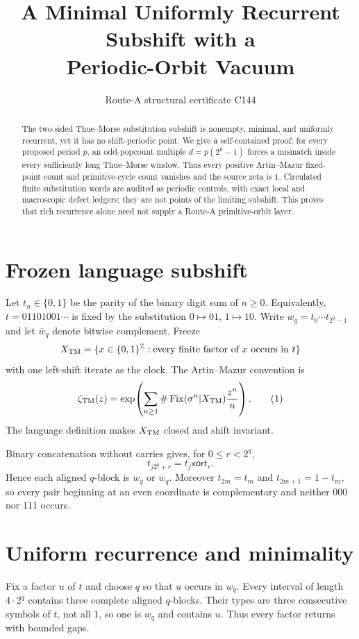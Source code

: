 \documentclass[10pt]{article}
\title{A Minimal Uniformly Recurrent Subshift with a\\Periodic-Orbit Vacuum}
\author{Route-A structural certificate C144}
\date{}
\begin{document}
\maketitle

\begin{abstract}
The two-sided Thue--Morse substitution subshift is nonempty, minimal, and
uniformly recurrent, yet it has no shift-periodic point.  We give a
self-contained proof: for every proposed period $p$, an odd-popcount multiple
$d=p(2^k-1)$ forces a mismatch inside every sufficiently long Thue--Morse
window.  Thus every positive Artin--Mazur fixed-point count and primitive-cycle
count vanishes and the source zeta is $1$.  Circulated finite substitution
words are audited as periodic controls, with exact local and macroscopic defect
ledgers; they are not points of the limiting subshift.  This proves that rich
recurrence alone need not supply a Route-A primitive-orbit layer.
\end{abstract}

\section{Frozen language subshift}
Let $t_n\in\{0,1\}$ be the parity of the binary digit sum of $n\geq0$.
Equivalently, $t=01101001\cdots$ is fixed by the substitution
$0\mapsto01$, $1\mapsto10$.  Write $w_q=t_0\cdots t_{2^q-1}$ and let
$\overline w_q$ denote bitwise complement.  Freeze
\[
X_{\rm TM}=\{x\in\{0,1\}^{\mathbb Z}:\text{every finite factor of $x$
occurs in $t$}\}
\]
with one left-shift iterate as the clock.  The Artin--Mazur convention is
\[
\zeta_{\rm TM}(z)=\exp\!\left(\sum_{n\geq1}
\#\operatorname{Fix}(\sigma^n|X_{\rm TM})\frac{z^n}{n}\right).       \tag{1}
\]
The language definition makes $X_{\rm TM}$ closed and shift invariant.

Binary concatenation without carries gives, for $0\leq r<2^q$,
\begin{equation}
t_{j2^q+r}=t_j\mathbin{\mathsf{xor}}t_r.                         \tag{2}
\end{equation}
Hence each aligned $q$-block is $w_q$ or $\overline w_q$.  Moreover
$t_{2m}=t_m$ and $t_{2m+1}=1-t_m$, so every pair beginning at an even
coordinate is complementary and neither $000$ nor $111$ occurs.

\section{Uniform recurrence and minimality}
Fix a factor $u$ of $t$ and choose $q$ so that $u$ occurs in $w_q$.  Every
interval of length $4\cdot2^q$ contains three complete aligned $q$-blocks.
Their types are three consecutive symbols of $t$, not all $1$, so one is
$w_q$ and contains $u$.  Thus every factor returns with bounded gaps.
\end{document}
